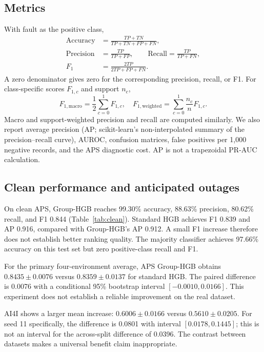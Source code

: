 \documentclass[conference]{IEEEtran}
\begin{document}
\subsection{Metrics}
With fault as the positive class,
\begin{align}
 \mathrm{Accuracy}&=\frac{TP+TN}{TP+TN+FP+FN},\\
 \mathrm{Precision}&=\frac{TP}{TP+FP},\qquad
 \mathrm{Recall}=\frac{TP}{TP+FN},\\
 F_1&=\frac{2TP}{2TP+FP+FN}.
\end{align}
A zero denominator gives zero for the corresponding precision, recall, or F1. For class-specific scores $F_{1,c}$ and support $n_c$,
\begin{equation}
 F_{1,\mathrm{macro}}=\frac12\sum_{c=0}^{1}F_{1,c},\quad
 F_{1,\mathrm{weighted}}=\sum_{c=0}^{1}\frac{n_c}{n}F_{1,c}.
\end{equation}
Macro and support-weighted precision and recall are computed similarly. We also report average precision (AP; scikit-learn's non-interpolated summary of the precision--recall curve), AUROC, confusion matrices, false positives per 1,000 negative records, and the APS diagnostic cost. AP is not a trapezoidal PR-AUC calculation.





\subsection{Clean performance and anticipated outages}
On clean APS, Group-HGB reaches 99.30\% accuracy, 88.63\% precision, 80.62\% recall, and F1 0.844 (Table~\ref{tab:clean}). Standard HGB achieves F1 0.839 and AP 0.916, compared with Group-HGB's AP 0.912. A small F1 increase therefore does not establish better ranking quality. The majority classifier achieves 97.66\% accuracy on this test set but zero positive-class recall and F1.

For the primary four-environment average, APS Group-HGB obtains $0.8435\pm0.0076$ versus $0.8359\pm0.0137$ for standard HGB. The paired difference is 0.0076 with a conditional 95\% bootstrap interval $[-0.0010,0.0166]$. This experiment does not establish a reliable improvement on the real dataset.

AI4I shows a larger mean increase: $0.6006\pm0.0166$ versus $0.5610\pm0.0205$. For seed 11 specifically, the difference is 0.0801 with interval $[0.0178,0.1445]$; this is not an interval for the across-split difference of 0.0396. The contrast between datasets makes a universal benefit claim inappropriate.
\end{document}
